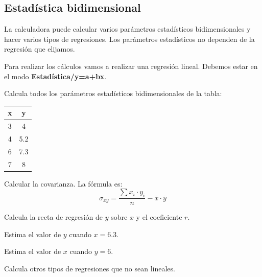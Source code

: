 \documentclass[12pt]{article}
\newenvironment{capitulo}{\begin{tcolorbox}[colback=blue!5!white,colframe=red!75!black]}{\end{tcolorbox}\bigskip}
\newenvironment{ejer}{\begin{tcolorbox}[center title, 
fonttitle=\sffamily\bfseries,colback=blue!5,colframe=orange]}{\end{tcolorbox}}
\begin{document}
\newpage

\begin{capitulo}
\section*{Estadística bidimensional}
\end{capitulo}

La calculadora puede calcular varios parámetros estadísticos bidimensionales y hacer varios tipos de regresiones. Los parámetros estadísticos no dependen de la regresión que elijamos. 

Para realizar los cálculos vamos a realizar una regresión lineal. Debemos estar en el modo \textbf{Estadística/y=a+bx}.

\begin{ejer}

Calcula todos los parámetros estadísticos bidimensionales de la tabla:

\begin{center}
\begin{tabular}{c|c}
x & y \\ \hline
3 & 4 \\
4 & 5.2 \\
6 & 7.3\\
7 & 8
\end{tabular}
\end{center}

Calcular la covarianza. La fórmula es:
\[
\sigma_{xy} = \frac{\sum x_i \cdot y_i}{n} - \bar x \cdot \bar y
\]

\end{ejer}

\begin{ejer}

Calcula la recta de regresión de $y$ sobre $x$ y el coeficiente $r$.

\end{ejer}

\begin{ejer}


Estima el valor de $y$ cuando $x= 6.3$.

Estima el valor de $x$ cuando $y=6$.


\end{ejer}

\begin{ejer}

Calcula otros tipos de regresiones que no sean lineales.


\end{ejer}
\end{document}
